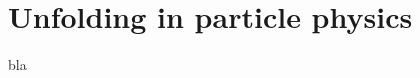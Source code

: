 %
%
%

\chapter{Unfolding in particle physics}\label{chap:unfolding}
\enlargethispage{2ex}
\vspace*{-2pt}

\enlargethispage{2ex}


bla

%
